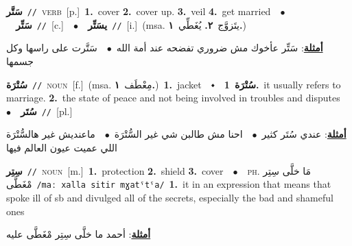 \documentclass[10pt,a4paper,twoside]{article} %
\begin{document}
\begin{multicols}{2}
{\setlength\topsep{0pt}\textbf{\foreignlanguage{arabic}{سَتَّر}}\ {\color{gray}\texttt{//}\color{black}}\ \textsc{verb}\ [p.]\ \textbf{1.}~cover  \textbf{2.}~cover up.  \textbf{3.}~veil  \textbf{4.}~get married\ \ $\bullet$\ \ \setlength\topsep{0pt}\textbf{\foreignlanguage{arabic}{سَتِّر}}\ {\color{gray}\texttt{//}\color{black}}\ [c.]\ \ $\bullet$\ \ \setlength\topsep{0pt}\textbf{\foreignlanguage{arabic}{يسَتِّر}}\ {\color{gray}\texttt{//}\color{black}}\ [i.]\ \color{gray}(msa. \foreignlanguage{arabic}{يتَزوَّج}~\foreignlanguage{arabic}{\textbf{٢.}}  \foreignlanguage{arabic}{يُغَطِّي}~\foreignlanguage{arabic}{\textbf{١.}})\color{black}\  \begin{flushright}\color{gray}\foreignlanguage{arabic}{\textbf{\underline{\foreignlanguage{arabic}{أمثلة}}}: سَتِّر عأخوك مش ضروري تفضحه عند أمة الله\ $\bullet$\ \  سَتَّرت على راسها وكل جسمها}\end{flushright}\color{black}} \vspace{2mm}

{\setlength\topsep{0pt}\textbf{\foreignlanguage{arabic}{سُتْرَة}}\ {\color{gray}\texttt{//}\color{black}}\ \textsc{noun}\ [f.]\ \color{gray}(msa. \foreignlanguage{arabic}{مِعْطَف}~\foreignlanguage{arabic}{\textbf{١.}})\color{black}\ \textbf{1.}~jacket\ \ $\smblkdiamond$\ \ \setlength\topsep{0pt}\textbf{\foreignlanguage{arabic}{سُتْرَة}}\ \textbf{1.}~it usually refers to marriage.  \textbf{2.}~the state of peace and not being involved in troubles and disputes\ \ $\bullet$\ \ \setlength\topsep{0pt}\textbf{\foreignlanguage{arabic}{سُتَر}}\ {\color{gray}\texttt{//}\color{black}}\ [pl.]\  \begin{flushright}\color{gray}\foreignlanguage{arabic}{\textbf{\underline{\foreignlanguage{arabic}{أمثلة}}}: عندي سُتَر كثير\ $\bullet$\ \  احنا مش طالبن شي غير السُّتْرَة\ $\bullet$\ \  ماعنديش غير هالسُّتْرَة اللي عميت عيون العالم فيها}\end{flushright}\color{black}} \vspace{2mm}

{\setlength\topsep{0pt}\textbf{\foreignlanguage{arabic}{سِتِر}}\ {\color{gray}\texttt{//}\color{black}}\ \textsc{noun}\ [m.]\ \textbf{1.}~protection  \textbf{2.}~shield  \textbf{3.}~cover\ \ $\bullet$\ \ \textsc{ph.} \color{gray} \foreignlanguage{arabic}{مَا خلَّى سِتِر مْغَطَّى}\color{black}\ {\color{gray}\texttt{/{\sffamily maː xalla sitir mɣatˤtˤa}/}\color{black}}\ \textbf{1.}~it in an expression that means that spoke ill of sb and divulged all of the secrets, especially the bad and shameful ones\  \begin{flushright}\color{gray}\foreignlanguage{arabic}{\textbf{\underline{\foreignlanguage{arabic}{أمثلة}}}: أحمد ما خلَّى سِتِر مْغَطَّى عليه}\end{flushright}\color{black}} \vspace{2mm}


\end{multicols}
\end{document}
